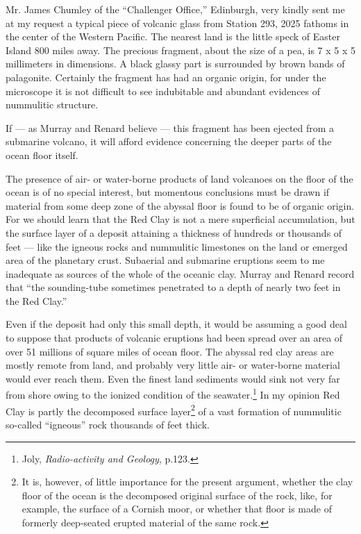 \documentclass[a4paper, 12pt, oneside]{article}
\begin{document}
Mr. James Chumley of the ``Challenger Office,'' Edinburgh, very kindly sent me at my request a typical piece of volcanic glass from Station 293, 2025 fathoms in the center of the Western Pacific. The nearest land is the little speck of Easter Island 800 miles away. The precious fragment, about the size of a pea, is 7 x 5 x 5 millimeters in dimensions. A black glassy part is surrounded by brown bands of palagonite. Certainly the fragment has had an organic origin, for under the microscope it is not difficult to see indubitable and abundant evidences of nummulitic structure.

If --- as Murray and Renard believe --- this fragment has been ejected from a submarine volcano, it will afford evidence concerning the deeper parts of the ocean floor itself.

The presence of air- or water-borne products of land volcanoes on the floor of the ocean is of no special interest, but momentous conclusions must be drawn if material from some deep zone of the abyssal floor is found to be of organic origin. For we should learn that the Red Clay is not a mere superficial accumulation, but the surface layer of a deposit attaining a thickness of hundreds or thousands of feet --- like the igneous rocks and nummulitic limestones on the land or emerged area of the planetary crust. Subaerial and submarine eruptions seem to me inadequate as sources of the whole of the oceanic clay. Murray and Renard record that ``the sounding-tube sometimes penetrated to a depth of nearly two feet in the Red Clay.''

Even if the deposit had only this small depth, it would be assuming a good deal to suppose that products of volcanic eruptions had been spread over an area of over 51 millions of square miles of ocean floor. The abyssal red clay areas are mostly remote from land, and probably very little air- or water-borne material would ever reach them. Even the finest land sediments would sink not very far from shore owing to the ionized condition of the seawater.\footnote{Joly, \emph{Radio-activity and Geology}, p.123.} In my opinion Red Clay is partly the decomposed surface layer\footnote{It is, however, of little importance for the present argument, whether the clay floor of the ocean is the decomposed original surface of the rock, like, for example, the surface of a Cornish moor, or whether that floor is made of formerly deep-seated erupted material of the same rock.} of a vast formation of nummulitic so-called ``igneous'' rock thousands of feet thick.
\end{document}
